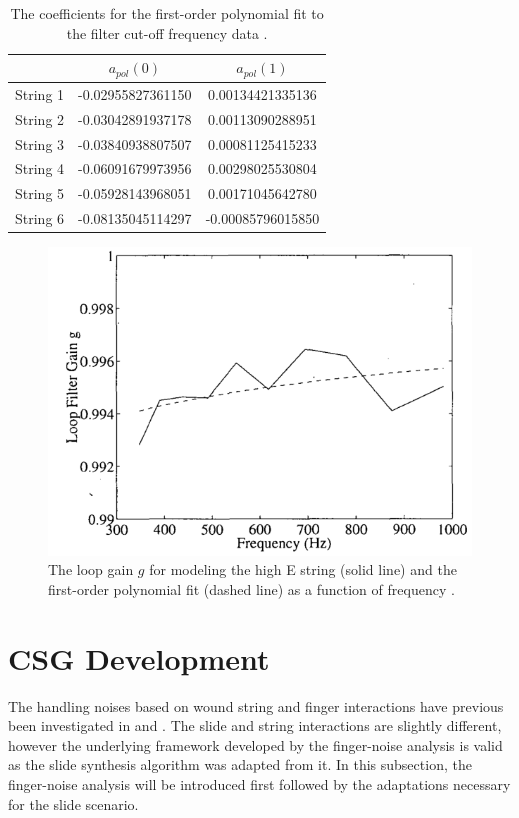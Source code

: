 \documentclass[main.tex]{subfiles}
\begin{document}
\begin{table}[h]
\centering
\begin{tabular}{|c| c| c|} 
 \hline
     & $a_{pol}(0)$ & $a_{pol}(1)$ \\ [0.5ex] 
 \hline
 String 1 & -0.02955827361150  & 0.00134421335136 \\ 
 String 2 & -0.03042891937178  & 0.00113090288951 \\ 
 String 3 & -0.03840938807507  & 0.00081125415233 \\ 
 String 4 & -0.06091679973956  & 0.00298025530804 \\ 
 String 5 & -0.05928143968051  & 0.00171045642780 \\ 
 String 6 & -0.08135045114297  & -0.00085796015850 \\ 
 \hline
\end{tabular}
\caption{The coefficients for the first-order polynomial fit to the filter cut-off frequency data .}
\label{tab:a_coeff}
\end{table}

\begin{figure}[!h]
    \centering
    \includegraphics[scale=.70]{./images/plots/Figure18Orig.png}
    \caption{The loop gain $g$ for modeling the high E string (solid line) and the first-order polynomial fit (dashed line) as a function of frequency .}
    \label{fig:originalLoopGain}
\end{figure}

\clearpage

\section{CSG Development} \label{sec:CSG_dev}
The handling noises based on wound string and finger interactions have previous been investigated in  and . The slide and string interactions are slightly different, however the underlying framework developed by the finger-noise analysis is valid as the slide synthesis algorithm was adapted from it. In this subsection, the finger-noise analysis will be introduced first followed by the adaptations necessary for the slide scenario.
\end{document}
